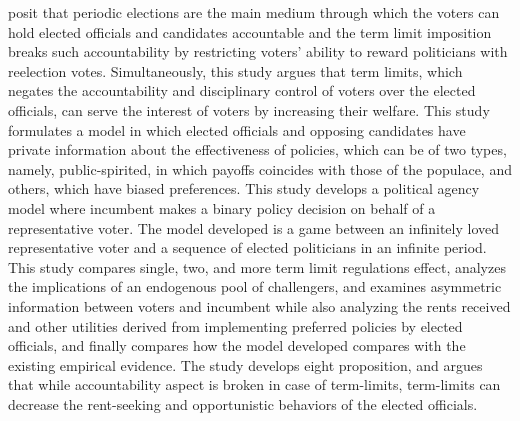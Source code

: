  posit that periodic elections are the main medium through which the voters can hold elected officials and candidates accountable and the term limit imposition breaks such accountability by restricting voters' ability to reward politicians with reelection votes. Simultaneously, this study argues that term limits, which negates the accountability and disciplinary control of voters over the elected officials, can serve the interest of voters by increasing their welfare. This study formulates a model in which elected officials and opposing candidates have private information about the effectiveness of policies, which can be of two types, namely, public-spirited, in which payoffs coincides with those of the populace, and others, which have biased preferences. This study develops a political agency model where incumbent makes a binary policy decision on behalf of a representative voter. The model developed is a game between an infinitely loved representative voter and a sequence of elected politicians in an infinite period. This study compares single, two, and more term limit regulations effect, analyzes the implications of an endogenous pool of challengers, and examines asymmetric information between voters and incumbent while also analyzing the rents received and other utilities derived from implementing preferred policies by elected officials, and finally compares how the model developed compares with the existing empirical evidence. The study develops eight proposition, and argues that while accountability aspect is broken in case of term-limits, term-limits can decrease the rent-seeking and opportunistic behaviors of the elected officials.\par
